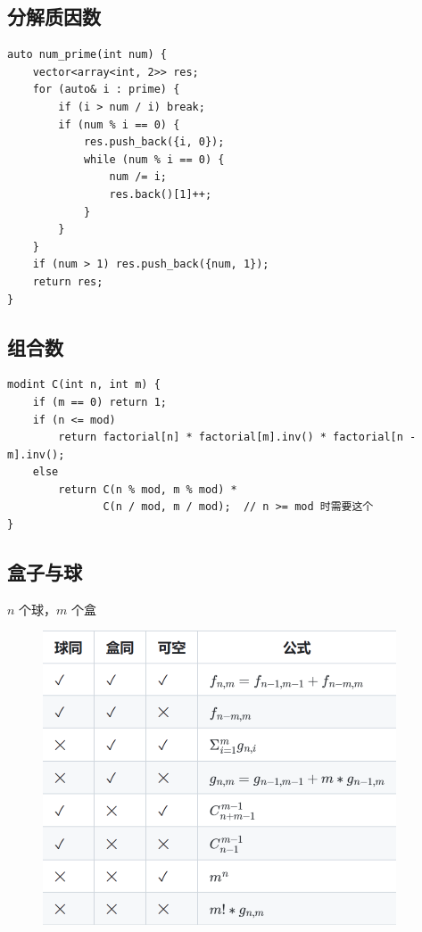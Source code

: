 \documentclass[UTF8]{ctexart}
\begin{document}
\begin{sloppypar}
\subsection{分解质因数}

\begin{lstlisting}[style=cpp]
auto num_prime(int num) {
    vector<array<int, 2>> res;
    for (auto& i : prime) {
        if (i > num / i) break;
        if (num % i == 0) {
            res.push_back({i, 0});
            while (num % i == 0) {
                num /= i;
                res.back()[1]++;
            }
        }
    }
    if (num > 1) res.push_back({num, 1});
    return res;
}
\end{lstlisting}

\subsection{组合数}

\begin{lstlisting}[style=cpp]
modint C(int n, int m) {
    if (m == 0) return 1;
    if (n <= mod)
        return factorial[n] * factorial[m].inv() * factorial[n - m].inv();
    else
        return C(n % mod, m % mod) *
               C(n / mod, m / mod);  // n >= mod 时需要这个
}
\end{lstlisting}

\subsection{盒子与球}

$n$ 个球，$m$ 个盒

\begin{figure}[H]
    \flushleft
    \includegraphics[]{box-and-ball.png}
    \label{fig:left}
\end{figure}


\end{sloppypar}
\end{document}
